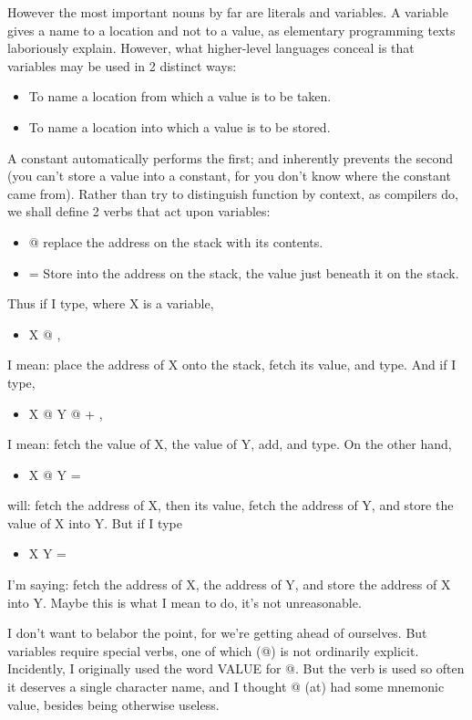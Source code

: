 \documentclass[b5paper, oneside]{book}
\begin{document}
However the most important nouns by far are literals and variables. A variable gives a name to a location and not to a value, as elementary programming texts laboriously explain. However, what higher-level languages conceal is that variables may be used in 2 distinct ways:\begin{itemize}
   \item To name a location from which a value is to be taken.
   \item To name a location into which a value is to be stored.\end{itemize}
A constant automatically performs the first; and inherently prevents the second (you can't store a value into a constant, for you don't know where the constant came from). Rather than try to distinguish function by context, as compilers do, we shall define 2 verbs that act upon variables:\begin{itemize}
   \item @ replace the address on the stack with its contents.
   \item = Store into the address on the stack, the value just beneath it on the stack.\end{itemize}
Thus if I type, where X is a variable,\begin{itemize}
   \item X @ ,\end{itemize}
I mean: place the address of X onto the stack, fetch its value, and type. And if I type,\begin{itemize}
   \item X @ Y @ + ,\end{itemize}
I mean: fetch the value of X, the value of Y, add, and type. On the other hand,\begin{itemize}
   \item X @ Y =\end{itemize}
will: fetch the address of X, then its value, fetch the address of Y, and store the value of X into Y. But if I type\begin{itemize}
   \item X Y =\end{itemize}
I'm saying: fetch the address of X, the address of Y, and store the address of X into Y. Maybe this is what I mean to do, it's not unreasonable.

I don't want to belabor the point, for we're getting ahead of ourselves. But variables require special verbs, one of which (@) is not ordinarily explicit. Incidently, I originally used the word VALUE for @. But the verb is used so often it deserves a single character name, and I thought @ (at) had some mnemonic value, besides being otherwise useless.
\end{document}
